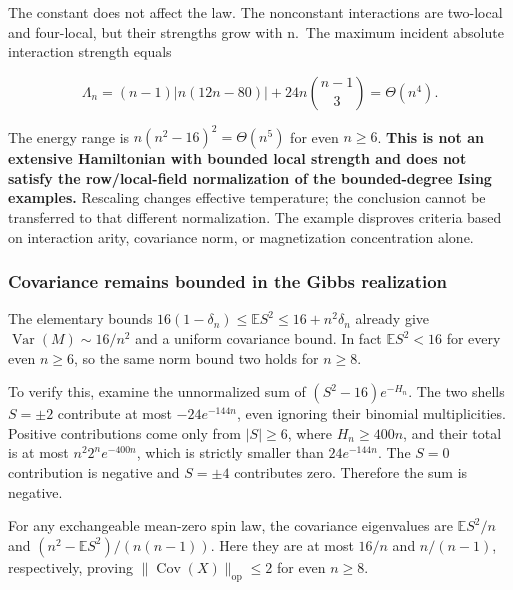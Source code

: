 The constant does not affect the law. The nonconstant interactions are
two-local and four-local, but their strengths grow with n.~The maximum
incident absolute interaction strength equals

\[
\Lambda_n=(n-1)|n(12n-80)|+24n\binom{n-1}{3}=\Theta(n^4).
\]

The energy range is \(n(n^{2}-16)^{2}=\Theta (n^{5})\) for even
\(n\ge 6\). \textbf{This is not an extensive Hamiltonian with bounded
local strength and does not satisfy the row/local-field normalization of
the bounded-degree Ising examples.} Rescaling changes effective
temperature; the conclusion cannot be transferred to that different
normalization. The example disproves criteria based on interaction
arity, covariance norm, or magnetization concentration alone.

\subsubsection{Covariance remains bounded in the Gibbs
realization}\label{proof:thin_shell_obstruction:covariance-remains-bounded-in-the-gibbs-realization}

The elementary bounds
\(16(1-\delta _n)\le \mathbb{E} S^{2}\le 16+n^{2}\delta _n\) already
give \(\operatorname{Var}(M)\sim 16/n^{2}\) and a uniform covariance
bound. In fact \(\mathbb{E} S^{2}<16\) for every even \(n\ge 6\), so the
same norm bound two holds for \(n\ge 8\).

To verify this, examine the unnormalized sum of \((S^{2}-16)e^{-H_n}\).
The two shells \(S=\pm 2\) contribute at most \(-24e^{-144n}\), even
ignoring their binomial multiplicities. Positive contributions come only
from \(|S|\ge 6\), where \(H_n\ge 400n\), and their total is at most
\(n^{2}2^n e^{-400n}\), which is strictly smaller than \(24e^{-144n}\).
The \(S=0\) contribution is negative and \(S=\pm 4\) contributes zero.
Therefore the sum is negative.

For any exchangeable mean-zero spin law, the covariance eigenvalues are
\(\mathbb{E} S^{2}/n\) and \((n^{2}-\mathbb{E} S^{2})/(n(n-1))\). Here
they are at most \(16/n\) and \(n/(n-1)\), respectively, proving
\(\lVert \operatorname{Cov}(X)\rVert_{\mathrm{op}}\le 2\) for even
\(n\ge 8\).
